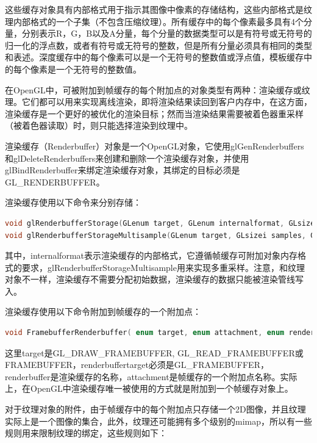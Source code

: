 这些缓存对象具有内部格式用于指示其图像中像素的存储结构，这些内部格式是纹理内部格式的一个子集（不包含压缩纹理）。所有缓存中的每个像素最多具有4个分量，分别表示R，G，B以及A分量，每个分量的数据类型可以是有符号或无符号的归一化的浮点数，或者有符号或无符号的整数，但是所有分量必须具有相同的类型和表述。深度缓存中的每个像素可以是一个无符号的整数值或浮点值，模板缓存中的每个像素是一个无符号的整数值。

在OpenGL中，可被附加到帧缓存的每个附加点的对象类型有两种：渲染缓存或纹理。它们都可以用来实现离线渲染，即将渲染结果读回到客户内存中，在这方面，渲染缓存是一个更好的被优化的渲染目标；然而当渲染结果需要被着色器重采样（被着色器读取）时，则只能选择渲染到纹理中。

渲染缓存（Renderbuffer）对象是一个OpenGL对象，它使用glGenRenderbuffers和glDeleteRenderbuffers​来创建和删除一个渲染缓存对象，并使用glBindRenderbuffer来绑定渲染缓存对象，其绑定的目标必须是GL\_RENDERBUFFER。

渲染缓存使用以下命令来分别存储：

\begin{lstlisting}[language=C++]
void glRenderbufferStorage​(GLenum target​, GLenum internalformat​, GLsizei width​, GLsizei height​);
void glRenderbufferStorageMultisample​(GLenum target​, GLsizei samples​, GLenum internalformat​, GLsizei width​, GLsizei height​);
\end{lstlisting}

其中，internalformat表示渲染缓存的内部格式，它遵循帧缓存可附加对象内存格式的要求，glRenderbufferStorageMultisample用来实现多重采样。注意，和纹理对象不一样，渲染缓存不需要分配初始数据，渲染缓存的数据只能被渲染管线写入。

渲染缓存使用以下命令附加到帧缓存的一个附加点：

\begin{lstlisting}[language=C++]
void FramebufferRenderbuffer( enum target, enum attachment, enum renderbuffertarget, uint renderbuffer );
\end{lstlisting}

这里target是GL\_DRAW\_FRAMEBUFFER, GL\_READ\_FRAMEBUFFER或FRAMEBUFFER，renderbuffertarget必须是GL\_FRAMEBUFFER，renderbuffer是渲染缓存的名称，attachment是帧缓存的一个附加点名称。实际上，在OpenGL中渲染缓存唯一被使用的方式就是附加到一个帧缓存对象上。

对于纹理对象的附件，由于帧缓存中的每个附加点只存储一个2D图像，并且纹理实际上是一个图像的集合，此外，纹理还可能拥有多个级别的mimap，所以有一些规则用来限制纹理的绑定，这些规则如下：

